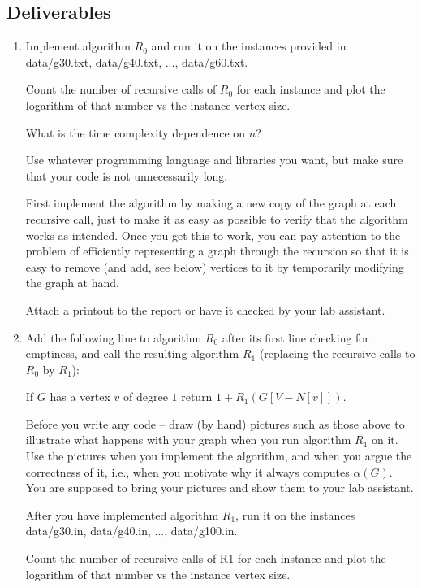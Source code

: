 \documentclass{tufte-handout}
\begin{document}
\subsection{Deliverables}

\begin{enumerate}
\item Implement algorithm $R_0$ and run it on the instances provided in
  data/g30.txt, data/g40.txt, ..., data/g60.txt.
  
  Count the number of recursive calls of $R_0$ for each instance and plot the
  logarithm of that number vs the instance vertex size. 
  
  What is the time complexity dependence on $n$?
  
  Use whatever programming language and libraries you want, but make
  sure that your code is not unnecessarily long.

  First implement the algorithm by making a new copy of the graph at
  each recursive call, just to make it as easy as possible to verify
  that the algorithm works as intended. Once you get this to work, you
  can pay attention to the problem of efficiently representing a graph
  through the recursion so that it is easy to remove (and add, see
  below) vertices to it by temporarily modifying the graph at hand.
   
  Attach a printout to the report or have it checked by your lab
  assistant.

\item Add the following line to algorithm $R_0$ after its first line
 checking for emptiness, and call the resulting algorithm $R_1$
 (replacing the recursive calls to $R_0$ by $R_1$):
 
 If $G$ has a vertex $v$ of degree $1$ return $1+R_1(G[V-N[v]])$.
 
 Before you write any code -- draw (by hand) pictures such as those
 above to illustrate what happens with your graph when you run
 algorithm $R_1$ on it. Use the pictures when you implement the
 algorithm, and when you argue the correctness of it, i.e., when you
 motivate why it always computes $\alpha(G)$. You are supposed to
 bring your pictures and show them to your lab assistant.
 
 After you have implemented algorithm $R_1$, run it on the instances
 data/g30.in, data/g40.in, $\ldots$, data/g100.in.

  Count the number of recursive calls of R1 for each instance and plot the
  logarithm of that number vs the instance vertex size.
  

\end{enumerate}
\end{document}
